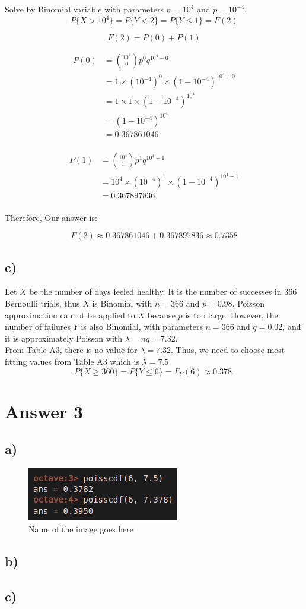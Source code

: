 \documentclass[12pt]{article}
\begin{document}
Solve by Binomial variable with parameters \( n = 10^4 \) and \( p = 10^{-4} \).
\[ P\{X > 10^4\} = P\{Y < 2\} = P\{Y \leq 1\} = F(2) \]

\[ F(2) = P(0) + P(1) \]

\begin{align*}
P(0) &=   \binom{10^4}{0} p^0 q^{10^4-0}\\
     &=   1 \times (10^{-4})^0 \times (1-10^{-4})^{10^4-0} \\
     &=   1 \times 1 \times (1-10^{-4})^{10^4} \\
     &=   (1-10^{-4})^{10^4} \\
     &=   0.367861046\\
\end{align*}

\begin{align*}
P(1) &=   \binom{10^4}{1} p^1 q^{10^4-1}\\
     &=   10^4 \times (10^{-4})^1 \times (1-10^{-4})^{10^4-1} \\
     &=   0.367897836\\
\end{align*}

Therefore, Our answer is:

\[ F(2) \approx 0.367861046 + 0.367897836 \approx 0.7358\]

\subsection*{c)} 

Let \( X \) be the number of days feeled healthy. It is the number of successes in 366 Bernoulli trials, thus \( X \) is Binomial with \( n = 366 \) and \( p = 0.98 \). Poisson approximation cannot be applied to \( X \) because \( p \) is too large. However, the number of failures \( Y \) is also Binomial, with parameters \( n = 366 \) and \( q = 0.02 \), and it is approximately Poisson with \( \lambda = nq = 7.32 \). \\

From Table A3, there is no value for $\lambda =7.32 $. Thus, we need to choose most fitting values from Table A3 which is $\lambda =7.5 $
\[ P \{X \geq 360\} = P \{Y \leq 6\} = F_Y(6) \approx 0.378. \]


\section*{Answer 3}
\subsection*{a)} 
\begin{figure}[h]
    \centering
    \includegraphics{3a_kod}
    \caption{Name of the image goes here}
\end{figure}

\subsection*{b)} 
\subsection*{c)} 
\end{document}
